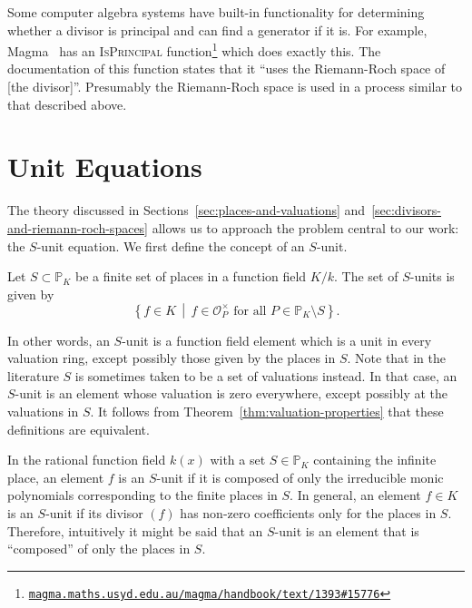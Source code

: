 Some computer algebra systems have built-in functionality for determining whether a divisor is principal and can find a generator if it is. For example, Magma~\cite{bosma-1997-the-magma-algebra} has an \textsc{IsPrincipal} function\footnote{\href{https://magma.maths.usyd.edu.au/magma/handbook/text/1393\#15776}{\texttt{magma.maths.usyd.edu.au/magma/handbook/text/1393\#15776}}} which does exactly this. The documentation of this function states that it ``uses the Riemann-Roch space of [the divisor]''. Presumably the Riemann-Roch space is used in a process similar to that described above.

\section{Unit Equations}%
\label{sec:unit-equations}

The theory discussed in Sections~\ref{sec:places-and-valuations} and~\ref{sec:divisors-and-riemann-roch-spaces} allows us to approach the problem central to our work: the \(S\)-unit equation. We first define the concept of an \(S\)-unit.

\begin{definition}
  Let \(S \subset \mathbb{P}_{K}\) be a finite set of places in a function field \(K / k\). The set of \(S\)-units is given by
  \[\left\{ f \in K \,\middle|\, f \in \mathcal{O}_{P}^{\times} \text{ for all } P \in \mathbb{P}_{K} \setminus S \right\}.\]
\end{definition}

In other words, an \(S\)-unit is a function field element which is a unit in every valuation ring, except possibly those given by the places in \(S\). Note that in the literature \(S\) is sometimes taken to be a set of valuations instead. In that case, an \(S\)-unit is an element whose valuation is zero everywhere, except possibly at the valuations in \(S\). It follows from Theorem~\ref{thm:valuation-properties} that these definitions are equivalent.

In the rational function field \(k(x)\) with a set \(S \in \mathbb{P}_{K}\) containing the infinite place, an element \(f\) is an \(S\)-unit if it is composed of only the irreducible monic polynomials corresponding to the finite places in \(S\). In general, an element \(f \in K\) is an \(S\)-unit if its divisor \((f)\) has non-zero coefficients only for the places in \(S\). Therefore, intuitively it might be said that an \(S\)-unit is an element that is ``composed'' of only the places in \(S\).


